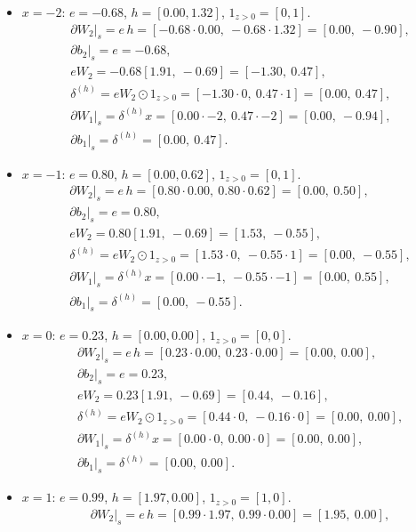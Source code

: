 \documentclass[11pt]{article}
\begin{document}
\begin{itemize}
\item $x=-2$: $e=-0.68$, $h=[0.00, 1.32]$, $1_{z>0}=[0,1]$.
\begin{align*}
&\partial W_2\big|_s = e\,h = [-0.68\cdot0.00,\ -0.68\cdot1.32] = [0.00,\ -0.90],\\
&\partial b_2\big|_s = e = -0.68,\\
&eW_2 = -0.68[1.91,\ -0.69] = [-1.30,\ 0.47],\\
&\delta^{(h)} = eW_2 \odot 1_{z>0} = [-1.30\cdot0,\ 0.47\cdot1] = [0.00,\ 0.47],\\
&\partial W_1\big|_s = \delta^{(h)} x = [0.00\cdot-2,\ 0.47\cdot-2] = [0.00,\ -0.94],\\
&\partial b_1\big|_s = \delta^{(h)} = [0.00,\ 0.47].
\end{align*}
\item $x=-1$: $e=0.80$, $h=[0.00, 0.62]$, $1_{z>0}=[0,1]$.
\begin{align*}
&\partial W_2\big|_s = e\,h = [0.80\cdot0.00,\ 0.80\cdot0.62] = [0.00,\ 0.50],\\
&\partial b_2\big|_s = e = 0.80,\\
&eW_2 = 0.80[1.91,\ -0.69] = [1.53,\ -0.55],\\
&\delta^{(h)} = eW_2 \odot 1_{z>0} = [1.53\cdot0,\ -0.55\cdot1] = [0.00,\ -0.55],\\
&\partial W_1\big|_s = \delta^{(h)} x = [0.00\cdot-1,\ -0.55\cdot-1] = [0.00,\ 0.55],\\
&\partial b_1\big|_s = \delta^{(h)} = [0.00,\ -0.55].
\end{align*}
\item $x=0$: $e=0.23$, $h=[0.00, 0.00]$, $1_{z>0}=[0,0]$.
\begin{align*}
&\partial W_2\big|_s = e\,h = [0.23\cdot0.00,\ 0.23\cdot0.00] = [0.00,\ 0.00],\\
&\partial b_2\big|_s = e = 0.23,\\
&eW_2 = 0.23[1.91,\ -0.69] = [0.44,\ -0.16],\\
&\delta^{(h)} = eW_2 \odot 1_{z>0} = [0.44\cdot0,\ -0.16\cdot0] = [0.00,\ 0.00],\\
&\partial W_1\big|_s = \delta^{(h)} x = [0.00\cdot0,\ 0.00\cdot0] = [0.00,\ 0.00],\\
&\partial b_1\big|_s = \delta^{(h)} = [0.00,\ 0.00].
\end{align*}
\item $x=1$: $e=0.99$, $h=[1.97, 0.00]$, $1_{z>0}=[1,0]$.
\begin{align*}
&\partial W_2\big|_s = e\,h = [0.99\cdot1.97,\ 0.99\cdot0.00] = [1.95,\ 0.00],\\

\end{align*}
\end{itemize}
\end{document}
